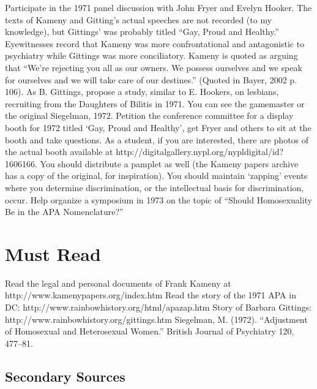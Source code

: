Participate in the 1971 panel discussion with John Fryer and Evelyn Hooker. The texts of Kameny and Gitting's actual speeches are not recorded (to my knowledge), but Gittings' was probably titled “Gay, Proud and Healthy.” Eyewitnesses record that Kameny was more confrontational and antagonistic to psychiatry while Gittings was more conciliatory. Kameny is quoted as arguing that “We're rejecting you all as our owners. We possess ourselves and we speak for ourselves and we will take care of our destines.” (Quoted in Bayer, 2002 p. 106).
As B. Gittings, propose a study, similar to E. Hookers, on lesbians, recruiting from the Daughters of Bilitis in 1971. You can see the gamemaster or the original Siegelman, 1972.
Petition the conference committee for a display booth for 1972 titled `Gay, Proud and Healthy', get Fryer and others to sit at the booth and take questions. As a student, if you are interested, there are photos of the actual booth available at http:\slash \slash digitalgallery.nypl.org\slash nypldigital\slash id?1606166. You should distribute a pamplet as well (the Kameny papers archive has a copy of the original, for inspiration).
You should maintain `zapping' events where you determine discrimination, or the intellectual basis for discrimination, occur.
Help organize a symposium in 1973 on the topic of “Should Homosexuality Be in the APA Nomenclature?”

\section{Must Read}
\label{mustread}

Read the legal and personal documents of Frank Kameny at http:\slash \slash www.kamenypapers.org\slash index.htm
Read the story of the 1971 APA in DC: http:\slash \slash www.rainbowhistory.org\slash html\slash apazap.htm
Story of Barbara Gittings: http:\slash \slash www.rainbowhistory.org\slash gittings.htm
Siegelman, M. (1972). “Adjustment of Homosexual and Heterosexual Women.” British Journal of Psychiatry 120, 477--81.

\subsection{Secondary Sources}
\label{secondarysources}

